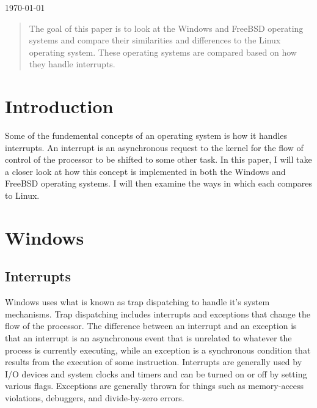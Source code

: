 \documentclass[journal,letterpaper,draftclsnofoot,onecolumn,10pt]{IEEEtran}
\begin{document}
\begin{titlepage}

{\large \today}\\[3cm] %

\begin{abstract}
The goal of this paper is to look at the Windows and FreeBSD operating systems and compare their similarities and differences to the Linux operating system. These operating systems are compared based on how they handle interrupts.
\end{abstract}

\vfill %

\pagebreak

\end{titlepage}

\setlength{\parindent}{3ex}

\section{Introduction}
Some of the fundemental concepts of an operating system is how it handles interrupts. An interrupt is an asynchronous request to the kernel for the flow of control of the processor to be shifted to some other task. In this paper, I will take a closer look at how this concept is implemented in both the Windows and FreeBSD operating systems. I will then examine the ways in which each compares to Linux.

\section{Windows}

\subsection{Interrupts}
Windows uses what is known as trap dispatching to handle it's system mechanisms. Trap dispatching includes interrupts and exceptions that change the flow of the processor. The difference between an interrupt and an exception is that an interrupt is an asynchronous event that is unrelated to whatever the process is currently executing, while an exception is a synchronous condition that results from the execution of some instruction. Interrupts are generally used by I/O devices and system clocks and timers and can be turned on or off by setting various flags. Exceptions are generally thrown for things such as memory-access violations, debuggers, and divide-by-zero errors.\cite{1ris12}
\end{document}
